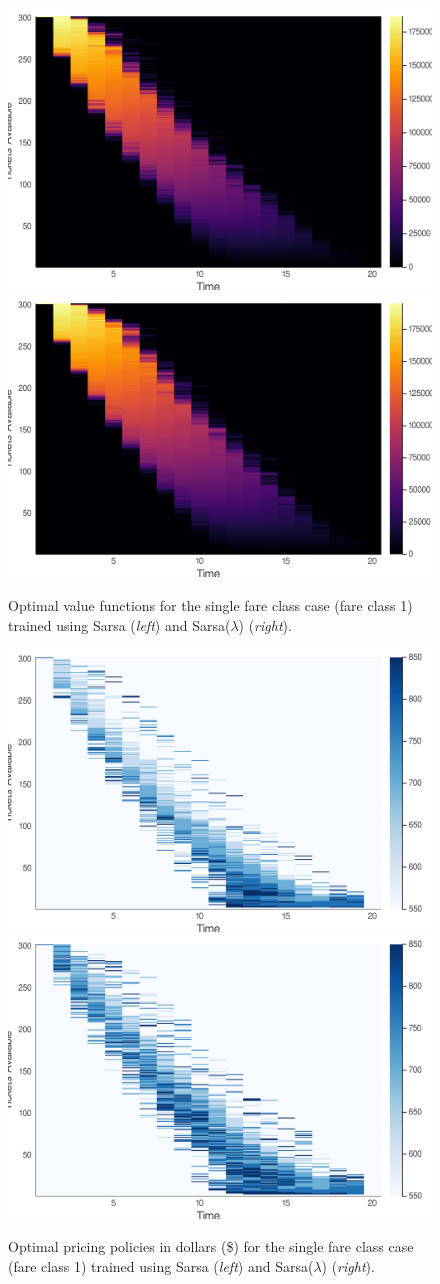 \documentclass[letterpaper]{article}%
\begin{document}
\begin{figure}[t!]
    \centering
    \label{fig:single-class-sarsa-U}
    \includegraphics[width=0.48\linewidth]{final-paper/plots/singleAgentSarsa-U.png} \;
     \includegraphics[width=0.48\linewidth]{final-paper/plots/singleAgentSarsaLambda-U.png}
    \caption{Optimal value functions for the single fare class case (fare class 1) trained using Sarsa (\textit{left}) and Sarsa($\lambda$) (\textit{right}).}
\end{figure}

\begin{figure}[h!]
    \centering
    \label{fig:single-class-sarsa-policy}
    \includegraphics[width=0.48\linewidth]{final-paper/plots/singleAgentSarsa-policy.png} \;
    \includegraphics[width=0.48\linewidth]{final-paper/plots/singleAgentSarsaLambda-policy.png}
    \caption{Optimal pricing policies in dollars (\$) for the single fare class case (fare class 1) trained using Sarsa (\textit{left}) and Sarsa($\lambda$) (\textit{right}).}
\end{figure}
\end{document}

